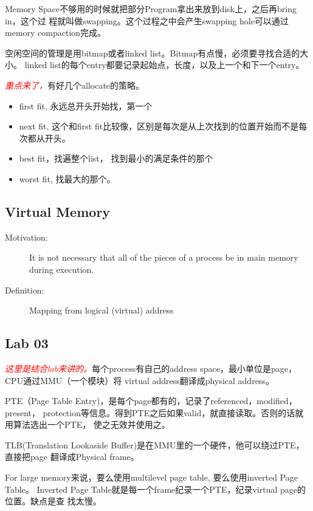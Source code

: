 \documentclass[a4paper]{article}
\newcommand{\emphasis}[1]{\textcolor{red}{\textit{#1}}}
\begin{document}
Memory Space不够用的时候就把部分Program拿出来放到disk上，之后再bring in，这个过
程就叫做swapping。这个过程之中会产生swapping hole可以通过memory compaction完成。

空闲空间的管理是用bitmap或者linked list。Bitmap有点慢，必须要寻找合适的大小。
linked list的每个entry都要记录起始点，长度，以及上一个和下一个entry。

\emphasis{重点来了，}有好几个allocate的策略。
\begin{itemize}
\item{first fit, 永远总开头开始找，第一个} 
\item{next fit, 这个和first fit比较像，区别是每次是从上次找到的位置开始而不是每
    次都从开头。} 
\item{best fit，找遍整个list， 找到最小的满足条件的那个} 
\item{worst fit, 找最大的那个。} 
\end{itemize}

\subsection{Virtual Memory}
\begin{description}
\item[Motivation:] It is not necessary that all of the pieces of a
process be in main memory during execution. 
\item[Definition:] Mapping from logical (virtual) address
\end{description}

\subsection{Lab 03}

\emphasis{这里是结合lab来讲的。}每个process有自己的address space，最小单位是page，CPU通过MMU（一个模块）将
virtual address翻译成physical address。

PTE（Page Table Entry)，是每个page都有的，记录了referenced，modified，present，
protection等信息。得到PTE之后如果valid，就直接读取。否则的话就用算法选出一个PTE，
使之无效并使用之。

TLB(Translation Lookaside Buffer)是在MMU里的一个硬件，他可以绕过PTE，直接把page
翻译成Physical frame。

For large memory来说，要么使用multilevel page table, 要么使用inverted Page Table。
Inverted Page Table就是每一个frame纪录一个PTE，纪录virtual page的位置。缺点是查
找太慢。
\end{document}
